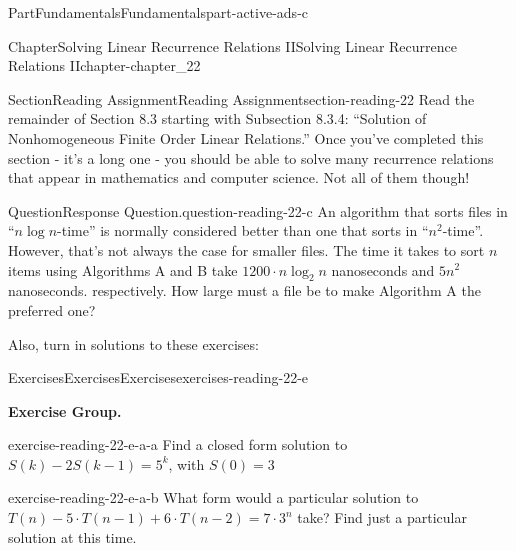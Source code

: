 \documentclass[oneside,10pt,]{book}
\numberwithin{equation}{section}
\begin{document}
\begin{partptx}{Part}{Fundamentals}{}{Fundamentals}{}{}{part-active-ads-c}
%
\typeout{************************************************}
\typeout{************************************************}
%
\begin{chapterptx}{Chapter}{Solving Linear Recurrence Relations II}{}{Solving Linear Recurrence Relations II}{}{}{chapter-chapter_22}
\renewcommand*{\chaptername}{Chapter}
\index{}%
%
%
\typeout{************************************************}
\typeout{************************************************}
%
\begin{sectionptx}{Section}{Reading Assignment}{}{Reading Assignment}{}{}{section-reading-22}
Read the remainder of Section 8.3 starting with Subsection 8.3.4: ``Solution of Nonhomogeneous Finite Order Linear Relations.''  Once you've completed this section - it's a long one - you should be able to solve many recurrence relations that appear in mathematics and computer science.   Not all of them though!%
\begin{question}{Question}{Response Question.}{question-reading-22-c}%
An algorithm that sorts files in ``\(n \log{n}\)-time'' is normally considered better than one that sorts in ``\(n^2\)-time''.  However, that's not always the case for smaller files.  The time it takes to sort \(n\) items using Algorithms A and B take \(1200\cdot n \log_2{n}\) nanoseconds and \(5 n^2\) nanoseconds. respectively. How large must a file be to make Algorithm A the preferred one?%
\end{question}
Also, turn in solutions to these exercises:%
%
%
\typeout{************************************************}
\typeout{************************************************}
%
\begin{exercises-subsection-numberless}{Exercises}{Exercises}{}{Exercises}{}{}{exercises-reading-22-e}
\par\medskip\noindent%
\textbf{Exercise Group.}\space\space%
\begin{exercisegroup}
\begin{divisionexerciseeg}{1}{}{}{exercise-reading-22-e-a-a}%
Find a closed form solution to \(S(k) - 2 S (k - 1) = 5^k\), with \(S(0) = 3\)%
\end{divisionexerciseeg}%
\begin{divisionexerciseeg}{2}{}{}{exercise-reading-22-e-a-b}%
What form would a particular solution to \(T(n)-5\cdot T(n-1)+6\cdot T(n-2)=7 \cdot 3^n\) take?  Find just a particular solution at this time.%
\end{divisionexerciseeg}%

\end{exercisegroup}
\end{exercises-subsection-numberless}
\end{sectionptx}
\end{chapterptx}
\end{partptx}
\end{document}
